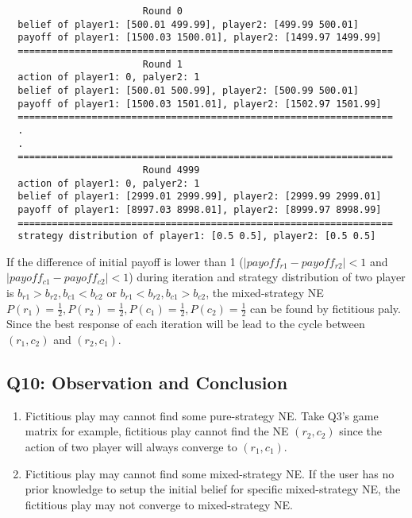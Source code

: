 \documentclass[a4paper, oneside, final, 12pt]{scrartcl} %
\begin{document}
\begin{lstlisting}
                        Round 0
  belief of player1: [500.01 499.99], player2: [499.99 500.01]
  payoff of player1: [1500.03 1500.01], player2: [1499.97 1499.99]
  ==================================================================
                        Round 1
  action of player1: 0, palyer2: 1
  belief of player1: [500.01 500.99], player2: [500.99 500.01]
  payoff of player1: [1500.03 1501.01], player2: [1502.97 1501.99]
  ==================================================================
  .
  .
  ==================================================================
                        Round 4999
  action of player1: 0, palyer2: 1
  belief of player1: [2999.01 2999.99], player2: [2999.99 2999.01]
  payoff of player1: [8997.03 8998.01], player2: [8999.97 8998.99]
  ==================================================================
  strategy distribution of player1: [0.5 0.5], player2: [0.5 0.5]
\end{lstlisting}

\begingroup
\raggedright
If the difference of initial payoff is lower than 1
($|payoff_{r1} - payoff_{r2}| < 1$ and $|payoff_{c1} - payoff_{c2}| < 1$) during iteration
and strategy distribution of two player is 
$b_{r1} > b_{r2}, b_{c1} < b_{c2}$  or  $b_{r1} < b_{r2}, b_{c1} > b_{c2}$, 
the mixed-strategy NE $P(r_1) = \frac{1}{2}, P(r_2) = \frac{1}{2}, 
P(c_1) = \frac{1}{2}, P(c_2) = \frac{1}{2}$ can be found by fictitious paly.
Since the best response of each iteration will be lead to the cycle 
between $(r_1, c_2)$ and $(r_2, c_1)$.
\endgroup

\subsection{Q10: Observation and Conclusion}

\begin{enumerate}
  \item Fictitious play may cannot find some pure-strategy NE.
  Take Q3's game matrix for example, fictitious play cannot find the NE $(r_2, c_2)$
  since the action of two player will always converge to $(r_1, c_1)$.
  \item Fictitious play may cannot find some mixed-strategy NE.
  If the user has no prior knowledge to setup the initial belief for specific mixed-strategy NE,
  the fictitious play may not converge to mixed-strategy NE.
\end{enumerate}

\end{document}
